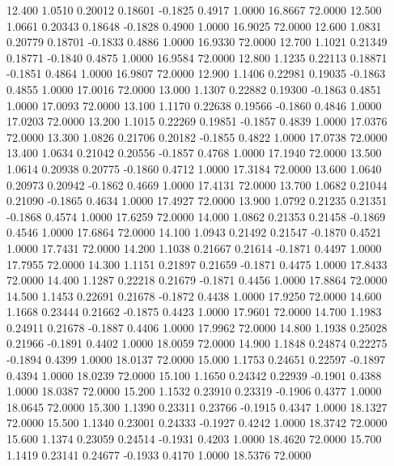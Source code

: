   12.400   1.0510   0.20012   0.18601  -0.1825   0.4917   1.0000  16.8667  72.0000
  12.500   1.0661   0.20343   0.18648  -0.1828   0.4900   1.0000  16.9025  72.0000
  12.600   1.0831   0.20779   0.18701  -0.1833   0.4886   1.0000  16.9330  72.0000
  12.700   1.1021   0.21349   0.18771  -0.1840   0.4875   1.0000  16.9584  72.0000
  12.800   1.1235   0.22113   0.18871  -0.1851   0.4864   1.0000  16.9807  72.0000
  12.900   1.1406   0.22981   0.19035  -0.1863   0.4855   1.0000  17.0016  72.0000
  13.000   1.1307   0.22882   0.19300  -0.1863   0.4851   1.0000  17.0093  72.0000
  13.100   1.1170   0.22638   0.19566  -0.1860   0.4846   1.0000  17.0203  72.0000
  13.200   1.1015   0.22269   0.19851  -0.1857   0.4839   1.0000  17.0376  72.0000
  13.300   1.0826   0.21706   0.20182  -0.1855   0.4822   1.0000  17.0738  72.0000
  13.400   1.0634   0.21042   0.20556  -0.1857   0.4768   1.0000  17.1940  72.0000
  13.500   1.0614   0.20938   0.20775  -0.1860   0.4712   1.0000  17.3184  72.0000
  13.600   1.0640   0.20973   0.20942  -0.1862   0.4669   1.0000  17.4131  72.0000
  13.700   1.0682   0.21044   0.21090  -0.1865   0.4634   1.0000  17.4927  72.0000
  13.900   1.0792   0.21235   0.21351  -0.1868   0.4574   1.0000  17.6259  72.0000
  14.000   1.0862   0.21353   0.21458  -0.1869   0.4546   1.0000  17.6864  72.0000
  14.100   1.0943   0.21492   0.21547  -0.1870   0.4521   1.0000  17.7431  72.0000
  14.200   1.1038   0.21667   0.21614  -0.1871   0.4497   1.0000  17.7955  72.0000
  14.300   1.1151   0.21897   0.21659  -0.1871   0.4475   1.0000  17.8433  72.0000
  14.400   1.1287   0.22218   0.21679  -0.1871   0.4456   1.0000  17.8864  72.0000
  14.500   1.1453   0.22691   0.21678  -0.1872   0.4438   1.0000  17.9250  72.0000
  14.600   1.1668   0.23444   0.21662  -0.1875   0.4423   1.0000  17.9601  72.0000
  14.700   1.1983   0.24911   0.21678  -0.1887   0.4406   1.0000  17.9962  72.0000
  14.800   1.1938   0.25028   0.21966  -0.1891   0.4402   1.0000  18.0059  72.0000
  14.900   1.1848   0.24874   0.22275  -0.1894   0.4399   1.0000  18.0137  72.0000
  15.000   1.1753   0.24651   0.22597  -0.1897   0.4394   1.0000  18.0239  72.0000
  15.100   1.1650   0.24342   0.22939  -0.1901   0.4388   1.0000  18.0387  72.0000
  15.200   1.1532   0.23910   0.23319  -0.1906   0.4377   1.0000  18.0645  72.0000
  15.300   1.1390   0.23311   0.23766  -0.1915   0.4347   1.0000  18.1327  72.0000
  15.500   1.1340   0.23001   0.24333  -0.1927   0.4242   1.0000  18.3742  72.0000
  15.600   1.1374   0.23059   0.24514  -0.1931   0.4203   1.0000  18.4620  72.0000
  15.700   1.1419   0.23141   0.24677  -0.1933   0.4170   1.0000  18.5376  72.0000
